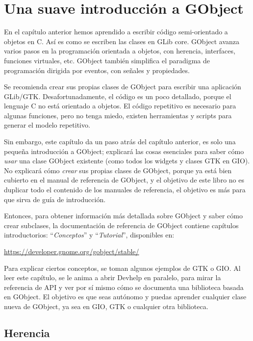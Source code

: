 \chapter{Una suave introducción a GObject}
\label{oop-gobject}

En el capítulo anterior hemos aprendido a escribir código semi-orientado a objetos en C. Así es como se escriben las clases en GLib core. GObject avanza varios pasos en la programación orientada a objetos, con herencia, interfaces, funciones virtuales, etc. GObject también simplifica el paradigma de programación dirigida por eventos, con señales y propiedades.

Se recomienda crear sus propias clases de GObject para escribir una aplicación GLib/GTK. Desafortunadamente, el código es un poco detallado, porque el lenguaje C no está orientado a objetos. El código repetitivo es necesario para algunas funciones, pero no tenga miedo, existen herramientas y scripts para generar el modelo repetitivo.

Sin embargo, este capítulo da un paso atrás del capítulo anterior, es solo una pequeña introducción a GObject; explicará las cosas esenciales para saber cómo \emph{usar} una clase GObject existente (como todos los widgets y clases GTK en GIO). No explicará cómo \emph{crear} sus propias clases de GObject, porque ya está bien cubierto en el manual de referencia de GObject, y el objetivo de este libro no es duplicar todo el contenido de los manuales de referencia, el objetivo es más para que sirva de guía de introducción.

Entonces, para obtener información más detallada sobre GObject y saber cómo crear subclases, la documentación de referencia de GObject contiene capítulos introductorios: ``\emph{Conceptos}'' y ``\emph{Tutorial}'', disponibles en:

\url{https://developer.gnome.org/gobject/stable/}

Para explicar ciertos conceptos, se toman algunos ejemplos de GTK o GIO. Al leer este capítulo, se le anima a abrir Devhelp en paralelo, para mirar la referencia de API y ver por sí mismo cómo se documenta una biblioteca basada en GObject. El objetivo es que seas autónomo y puedas aprender cualquier clase nueva de GObject, ya sea en GIO, GTK o cualquier otra biblioteca.

\section{Herencia}
\label{oop-gobject-inheritance}

